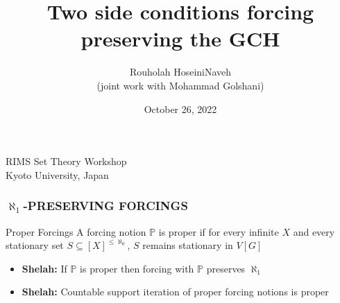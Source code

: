\documentclass[10pt]{beamer}
\begin{document}
\title{Two side conditions forcing preserving the GCH}
\author{Rouholah HoseiniNaveh\\
(joint work with Mohammad Golshani)}
\begin{frame}
\date{October 26, 2022}
\maketitle

\begin{center}
RIMS Set Theory Workshop\\
Kyoto University, Japan
\end{center}
\end{frame}

\begin{frame}
\frametitle{$\aleph_1$-PRESERVING FORCINGS}
\begin{block}{Proper Forcings}
A forcing notion $\mathbb{P}$ is proper if for every infinite $X$ and every stationary set $S \subseteq [X]^{\leq \aleph_0}$, $S$ remains stationary in $V[G]$
\end{block}
\begin{itemize}
\item \textbf{Shelah:} If $\mathbb{P}$ is proper then forcing with $\mathbb{P}$ preserves $\aleph_1$
\item \textbf{Shelah:} Countable support iteration of proper forcing notions is proper
\end{itemize}
\end{frame}
\end{document}

